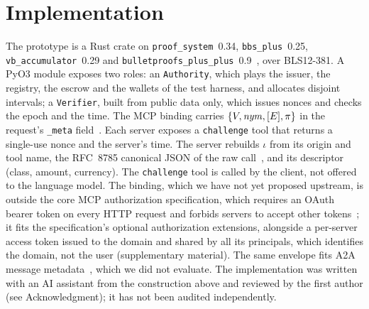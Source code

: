 \section{Implementation}\label{sec:impl}
{\sloppy The prototype is a Rust crate on \texttt{proof\_system}~0.34, \texttt{bbs\_plus}~0.25, \texttt{vb\_accumulator}~0.29 and \texttt{bulletproofs\_plus\_plus}~0.9~\cite{dockcrypto}, over BLS12-381. A PyO3 module exposes two roles:
an \texttt{Authority}, which plays the issuer, the registry, the escrow and the wallets of the test harness, and allocates disjoint intervals; a \texttt{Verifier}, built from public data only, which issues nonces and checks the epoch and the time.
The MCP binding carries $\{V,\mathit{nym},[E],\pi\}$ in the request's \texttt{\_meta} field~\cite{mcpspec}. Each server exposes a \texttt{challenge} tool that returns a single-use nonce and the server's time. The server rebuilds $\iota$ from its origin and tool name, the RFC~8785 canonical JSON of the raw call~\cite{rfc8785}, and its descriptor (class, amount, currency). The \texttt{challenge} tool is called by the client, not offered to the language model. The binding, which we have not yet proposed upstream, is outside the core MCP authorization specification, which requires an OAuth bearer token on every HTTP request and forbids servers to accept other tokens~\cite{mcpauth}; it fits the specification's optional authorization extensions, alongside a per-server access token issued to the domain and shared by all its principals, which identifies the domain, not the user (supplementary material). The same envelope fits A2A message metadata~\cite{a2aspec}, which we did not evaluate. The implementation was written with an AI assistant from the construction above and reviewed by the first author (see Acknowledgment); it has not been audited independently.\par}
